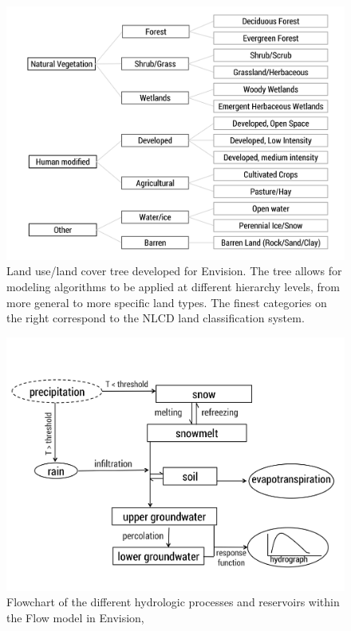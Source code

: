 \documentclass[water,article,submit,moreauthors,pdftex,10pt,a4paper]{mdpi}
\theoremstyle{mdpi}
\newcounter{thm}
\newcounter{ex}
\newcounter{re}
\theoremstyle{mdpidefinition}
\begin{document}
\begin{figure}
\centering
\includegraphics[width=\textwidth]{figure-files/figure2.png}
\caption{Land use/land cover tree developed for Envision. The tree allows for modeling algorithms to be applied at different hierarchy levels, from more general to more specific land types. The finest categories on the right correspond to the NLCD land classification system.}
\label{fig:LULCtree}
\end{figure}
\clearpage

\begin{figure}
\centering
\includegraphics[width=\textwidth]{figure-files/figure3.png}
\caption{Flowchart of the different hydrologic processes and reservoirs within the Flow model in Envision, \citep[modified from][]{Han:2017tx}}
\label{fig:ModelFlowchart}
\end{figure}
\clearpage
\end{document}
